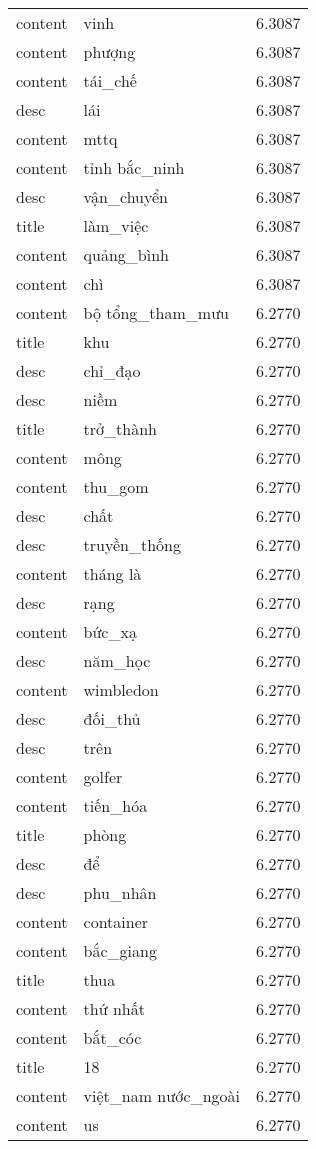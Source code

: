 \documentclass{article}
\begin{document}
\begin{tabular}{lll}
content & vinh & 6.3087\\
content & phượng & 6.3087\\
content & tái\_chế & 6.3087\\
desc & lái & 6.3087\\
content & mttq & 6.3087\\
content & tỉnh bắc\_ninh & 6.3087\\
desc & vận\_chuyển & 6.3087\\
title & làm\_việc & 6.3087\\
content & quảng\_bình & 6.3087\\
content & chì & 6.3087\\
content & bộ tổng\_tham\_mưu & 6.2770\\
title & khu & 6.2770\\
desc & chỉ\_đạo & 6.2770\\
desc & niềm & 6.2770\\
title & trở\_thành & 6.2770\\
content & mông & 6.2770\\
content & thu\_gom & 6.2770\\
desc & chất & 6.2770\\
desc & truyền\_thống & 6.2770\\
content & tháng là & 6.2770\\
desc & rạng & 6.2770\\
content & bức\_xạ & 6.2770\\
desc & năm\_học & 6.2770\\
content & wimbledon & 6.2770\\
desc & đối\_thủ & 6.2770\\
desc & trên & 6.2770\\
content & golfer & 6.2770\\
content & tiến\_hóa & 6.2770\\
title & phòng & 6.2770\\
desc & để & 6.2770\\
desc & phu\_nhân & 6.2770\\
content & container & 6.2770\\
content & bắc\_giang & 6.2770\\
title & thua & 6.2770\\
content & thứ nhất & 6.2770\\
content & bắt\_cóc & 6.2770\\
title & 18 & 6.2770\\
content & việt\_nam nước\_ngoài & 6.2770\\
content & us & 6.2770\\

\end{tabular}
\end{document}
